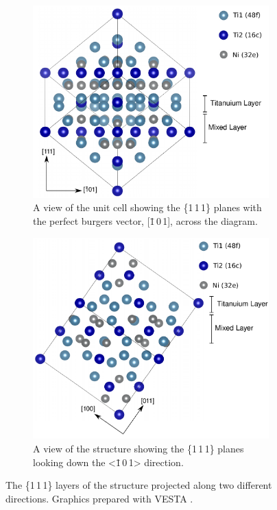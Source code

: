 \begin{figure}
\centering
\begin{subfigure}{0.65\textwidth}
\centering
\includegraphics[width=\textwidth]{Ti2Ni_111_down_211}
\caption{A view of the  unit cell showing the \{1\,1\,1\} planes with the perfect burgers vector, [\=1\,0\,1], across the diagram.\label{fig:slip_system_Ti2Ni}}
\end{subfigure}

\begin{subfigure}{0.65\textwidth}
\centering
\includegraphics[width=\textwidth]{Ti2Ni_111_down_101}
\caption{A view of the  structure showing the \{1\,1\,1\} planes looking down the <\=1\,0\,1> direction.\label{fig:Laves_phase_Ti2Ni_similarity}}
\end{subfigure}
\caption[The \{1\,1\,1\} planes of the  structure.]{The \{1\,1\,1\} layers of the  structure projected along two different directions. Graphics prepared with VESTA \cite{Momma2011}. \label{fig:Ti2Ni_111_planes}}
\end{figure}

